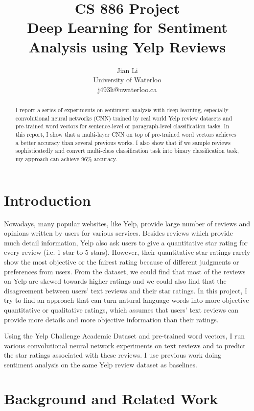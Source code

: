 \documentclass[11pt]{article}
\title{CS 886 Project\\Deep Learning for Sentiment Analysis using Yelp Reviews}
\author{Jian Li\\University of Waterloo\\j493li@uwaterloo.ca}
\date{}
\theoremstyle{definition}
\theoremstyle{basic}
\begin{document}
\maketitle

\begin{abstract}
I report a series of experiments on sentiment analysis with deep learning, especially convolutional neural networks (CNN) trained by real world Yelp review datasets and pre-trained word vectors for sentence-level or paragraph-level classification tasks.
In this report, I show that a multi-layer CNN on top of pre-trained word vectors achieves a better accuracy than several previous works.
I also show that if we sample reviews sophisticatedly and convert multi-class classification task into binary classification task, my approach can achieve 96\% accuracy.
\end{abstract}


\section{Introduction}

Nowadays, many popular websites, like Yelp, provide large number of reviews and opinions written by users for various services.
Besides reviews which provide much detail information, Yelp also ask users to give a quantitative star rating for every review (i.e. 1 star to 5 stars).
However, their quantitative star ratings rarely show the most objective or the fairest rating because of different judgments or preferences from users.
From the dataset, we could find that most of the reviews on Yelp are skewed towards higher ratings and we could also find that the disagreement between users' text reviews and their star ratings.
In this project, I try to find an approach that can turn natural language words into more objective quantitative or qualitative ratings, which assumes that users' text reviews can provide more details and more objective information than their ratings.

Using the Yelp Challenge Academic Dataset and pre-trained word vectors, I run various convolutional neural network experiments on text reviews and to predict the star ratings associated with these reviews.
I use previous work doing sentiment analysis on the same Yelp review dataset as baselines.



\section{Background and Related Work}
\end{document}
